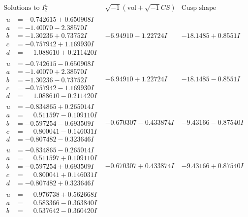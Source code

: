 \documentclass[1p]{elsarticle_modified}
\theoremstyle{definition}
\newcommand{\I}{\sqrt{-1}}
\begin{document}
$$\begin{array}{c|c|c}  
\text{Solutions to }I^u_{2}& \I (\text{vol} + \sqrt{-1}CS) & \text{Cusp shape}\\
 \hline 
\begin{aligned}
u &= -0.742615 + 0.650908 I \\
a &= -1.40070 - 2.38570 I \\
b &= -1.30236 + 0.73752 I \\
c &= -0.757942 + 1.169930 I \\
d &= \phantom{-}1.088610 + 0.211420 I\end{aligned}
 & -6.94910 - 1.22724 I & -18.1485 + 0.8551 I \\ \hline\begin{aligned}
u &= -0.742615 - 0.650908 I \\
a &= -1.40070 + 2.38570 I \\
b &= -1.30236 - 0.73752 I \\
c &= -0.757942 - 1.169930 I \\
d &= \phantom{-}1.088610 - 0.211420 I\end{aligned}
 & -6.94910 + 1.22724 I & -18.1485 - 0.8551 I \\ \hline\begin{aligned}
u &= -0.834865 + 0.265014 I \\
a &= \phantom{-}0.511597 - 0.109110 I \\
b &= -0.597254 - 0.693509 I \\
c &= \phantom{-}0.800041 - 0.146031 I \\
d &= -0.807482 - 0.323646 I\end{aligned}
 & -0.670307 - 0.433874 I & -9.43166 - 0.87540 I \\ \hline\begin{aligned}
u &= -0.834865 - 0.265014 I \\
a &= \phantom{-}0.511597 + 0.109110 I \\
b &= -0.597254 + 0.693509 I \\
c &= \phantom{-}0.800041 + 0.146031 I \\
d &= -0.807482 + 0.323646 I\end{aligned}
 & -0.670307 + 0.433874 I & -9.43166 + 0.87540 I \\ \hline\begin{aligned}
u &= \phantom{-}0.976738 + 0.562668 I \\
a &= \phantom{-}0.583366 - 0.363840 I \\
b &= \phantom{-}0.537642 - 0.360420 I \\

\end{aligned}
\end{array}$$
\end{document}
